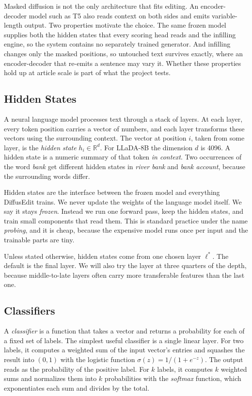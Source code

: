 \documentclass[]{paper}
\begin{document}
Masked diffusion is not the only architecture that fits editing. An encoder-decoder model such as T5 also reads context on both sides and emits variable-length output. Two properties motivate the choice. The same frozen model supplies both the hidden states that every scoring head reads and the infilling engine, so the system contains no separately trained generator. And infilling changes only the masked positions, so untouched text survives exactly, where an encoder-decoder that re-emits a sentence may vary it. Whether these properties hold up at article scale is part of what the project tests.

\subsection{Hidden States}
\label{sec:hidden}

A neural language model processes text through a stack of layers. At each layer, every token position carries a vector of numbers, and each layer transforms these vectors using the surrounding context. The vector at position $i$, taken from some layer, is the \emph{hidden state} $h_i \in \mathbb{R}^d$. For LLaDA-8B the dimension $d$ is 4096. A hidden state is a numeric summary of that token \emph{in context}. Two occurrences of the word \emph{bank} get different hidden states in \emph{river bank} and \emph{bank account}, because the surrounding words differ.

Hidden states are the interface between the frozen model and everything DiffusEdit trains. We never update the weights of the language model itself. We say it stays \emph{frozen}. Instead we run one forward pass, keep the hidden states, and train small components that read them. This is standard practice under the name \emph{probing}, and it is cheap, because the expensive model runs once per input and the trainable parts are tiny.

Unless stated otherwise, hidden states come from one chosen layer $\ell^\ast$. The default is the final layer. We will also try the layer at three quarters of the depth, because middle-to-late layers often carry more transferable features than the last one.

\subsection{Classifiers}
\label{sec:classifiers}

A \emph{classifier} is a function that takes a vector and returns a probability for each of a fixed set of labels. The simplest useful classifier is a single linear layer. For two labels, it computes a weighted sum of the input vector's entries and squashes the result into $(0, 1)$ with the logistic function $\sigma(z) = 1 / (1 + e^{-z})$. The output reads as the probability of the positive label. For $k$ labels, it computes $k$ weighted sums and normalizes them into $k$ probabilities with the \emph{softmax} function, which exponentiates each sum and divides by the total.
\end{document}
